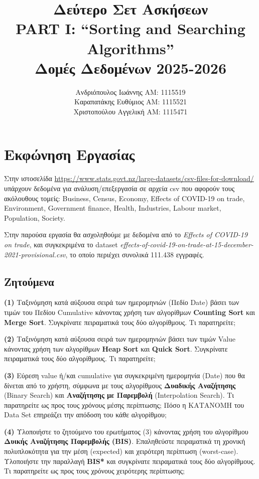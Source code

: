 \documentclass[a4paper,12pt]{article}
\title{Δεύτερο Σετ Ασκήσεων\\PART I: “Sorting and Searching Algorithms” \\ Δομές Δεδομένων 2025-2026}
\author{
	Ανδριόπουλος Ιωάννης ΑΜ: 1115519\\
	Καραπατάκης Ευθύμιος ΑΜ: 1115521\\
	Χριστοπούλου Αγγελική ΑΜ: 1115471
}
\begin{document}
	
	\maketitle 
	\newpage
	\tableofcontents
	\newpage
	
	\section{Εκφώνηση Εργασίας}
	
	Στην ιστοσελίδα \url{https://www.stats.govt.nz/large-datasets/csv-files-for-download/} υπάρχουν δεδομένα για ανάλυση/επεξεργασία σε αρχεία csv που αφορούν τους ακόλουθους τομείς: Business, Census, Economy, Effects of COVID-19 on trade, Environment, Government finance, Health, Industries, Labour market, Population, Society. 
	
	Στην παρούσα εργασία θα ασχοληθούμε με δεδομένα από το \textit{Effects of COVID-19 on trade}, και συγκεκριμένα το dataset \textit{effects-of-covid-19-on-trade-at-15-december-2021-provisional.csv}, το οποίο περιέχει συνολικά 111.438 εγγραφές.
	
	\subsection{Ζητούμενα}
	
	\textbf{(1)} Ταξινόμηση κατά αύξουσα σειρά των ημερομηνιών (Πεδίο Date) βάσει των τιμών του Πεδίου Cumulative κάνοντας χρήση των αλγορίθμων \textbf{Counting Sort} και \textbf{Merge Sort}. Συγκρίνατε πειραματικά τους δύο αλγορίθμους. Τι παρατηρείτε;
	
	\textbf{(2)} Ταξινόμηση κατά αύξουσα σειρά των ημερομηνιών βάσει των τιμών Value κάνοντας χρήση των αλγορίθμων \textbf{Heap Sort} και \textbf{Quick Sort}. Συγκρίνατε πειραματικά τους δύο αλγορίθμους. Τι παρατηρείτε;
	
	\textbf{(3)} Εύρεση value ή/και cumulative για συγκεκριμένη ημερομηνία (Date) που θα δίνεται από το χρήστη, σύμφωνα με τους αλγορίθμους \textbf{Δυαδικής Αναζήτησης} (Binary Search) και \textbf{Αναζήτησης με Παρεμβολή} (Interpolation Search). Τι παρατηρείτε ως προς τους χρόνους μέσης περίπτωσης; Πόσο η ΚΑΤΑΝΟΜΗ του Data Set επηρεάζει την απόδοση του κάθε αλγορίθμου;
	
	\textbf{(4)} Υλοποιήστε το ζητούμενο του ερωτήματος (3) κάνοντας χρήση του αλγορίθμου \textbf{Δυικής Αναζήτησης Παρεμβολής (BIS)}. Επαληθεύστε πειραματικά τη χρονική πολυπλοκότητα για την μέση (expected) και χειρότερη περίπτωση (worst-case). Υλοποιήστε την παραλλαγή \textbf{BIS*} και συγκρίνατε πειραματικά τους δύο αλγορίθμους. Τι παρατηρείτε ως προς τους χρόνους χειρότερης περίπτωσης;
	
\end{document}
